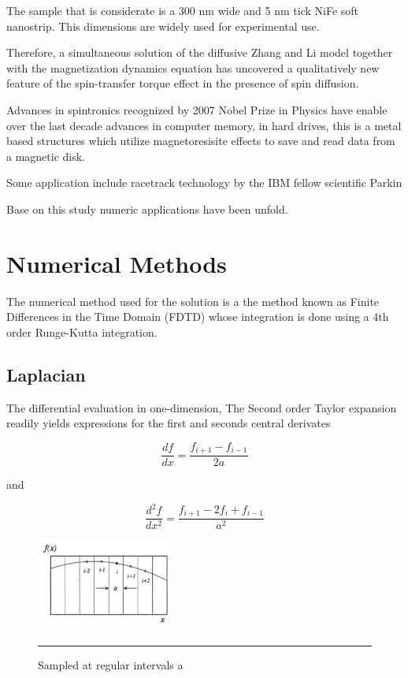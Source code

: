The sample that is considerate is a 300 nm wide and 5 nm tick NiFe soft nanostrip. This dimensions are widely used for experimental use.

Therefore, a simultaneous solution of the diffusive Zhang and Li model together with the magnetization dynamics equation has uncovered a qualitatively new feature of the spin-transfer torque effect in the presence of spin diffusion.


Advances in spintronics recognized by 2007 Nobel Prize in Physics have enable over the last decade advances in computer memory, in hard drives, this is a metal based structures which utilize magnetoresisite effects to save and read data from a magnetic disk. \cite{handbookspin}

Some application include racetrack technology by the IBM fellow scientific Parkin \cite{racetrack}

Base on this study numeric applications have been unfold.


\section{Numerical Methods}

 The numerical method used for the solution is a the method known as Finite Differences in the Time Domain (FDTD) whose integration is done using a 4th order Runge-Kutta integration.
 


\subsection{Laplacian}


\cite{landaverde}

The differential evaluation in one-dimension,
The Second order Taylor expansion readily yields expressions for the first and seconds central derivates

$$ \dfrac{df}{dx} = \dfrac{f_{i+1} - f_{i-1} }{2a}$$

and

$$ \dfrac{d^{2}f}{dx^{2}} = \dfrac{f_{i+1} - 2f_{i}+f_{i-1} }{a^2}$$

\begin{figure}[htbp]
	\centering
		\includegraphics[width=0.4\textwidth]{Figures/taylor.png}
		\rule{35em}{0.2pt}
	\caption[Sampled at regular intervals a, Taylor expansion]{Sampled at regular intervals a}
	\label{fig:taylor}
\end{figure}

